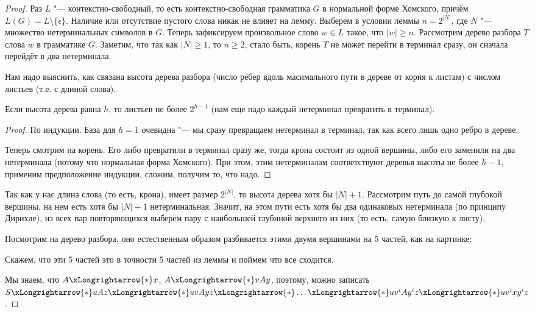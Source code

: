 \begin{proof}
    Раз $L$ "--- контекстно-свободный, то есть контекстно-свободная грамматика $G$ в нормальной
    форме Хомского, причём $L(G) = L \setminus \{ \epsilon \}$.
    Наличие или отсутствие пустого слова никак не влияет на лемму.
    Выберем в условии леммы $n=2^{|N|}$, где $N$ "--- множество нетерминальных символов в $G$.
    Теперь зафиксируем произвольное слово $w \in L$ такое, что $|w| \ge n$.
    Рассмотрим дерево разбора $T$ слова $w$ в грамматике $G$.
    Заметим, что так как $|N|\ge 1$, то $n \ge 2$, стало быть, корень $T$ не может перейти в терминал сразу,
    он сначала перейдёт в два нетерминала.

    Нам надо выяснить, как связана высота дерева разбора (число рёбер вдоль масимального пути в дереве
    от корня к листам) с числом листьев (т.е. с длиной слова).
    \begin{assertion}
        Если высота дерева равна $h$, то листьев не более $2^{h-1}$
        (нам еще надо каждый нетерминал превратить в терминал).
    \end{assertion}
    \begin{proof}
        По индукции. База для $h = 1$ очевидна "--- мы сразу превращаем нетерминал в терминал, так как всего лишь одно ребро в дереве.

        Теперь смотрим на корень. Его либо превратили в терминал сразу же, тогда крона состоит из одной вершины, либо его заменили на два нетерминала (потому что нормальная форма Хомского). 
        При этом, этим нетерминалам соответствуют деревья высоты не более $h - 1$, применим предположение индукции, сложим, получим то, что надо.
    \end{proof}
    Так как у нас длина слова (то есть, крона), имеет размер $2^{|N|}$, то высота дерева хотя бы $|N| + 1$.
    Рассмотрим путь до самой глубокой вершины, на нем есть хотя бы $|N| + 1$ нетерминальная.
    Значит, на этом пути есть хотя бы два одинаковых нетерминала (по принципу Дирихле), из всех пар повторяющихся выберем пару с наибольшей глубиной верхнего из них (то есть, самую близкую к листу).

    Посмотрим на дерево разбора, оно естественным образом разбивается этими двумя вершинами на 5 частей, как на картинке:

    Скажем, что эти 5 частей это в точности 5 частей из леммы и поймем что все сходится.

    Мы знаем, что $A \xLongrightarrow{*} x$, $A \xLongrightarrow{*} vAy$, поэтому, можно записать
    $S \xLongrightarrow{*} uAz \xLongrightarrow{*} uvAyz \xLongrightarrow{*} \dots \xLongrightarrow{*} uv^iAy^iz \xLongrightarrow{*} uv^ixy^iz$.


\end{proof}
